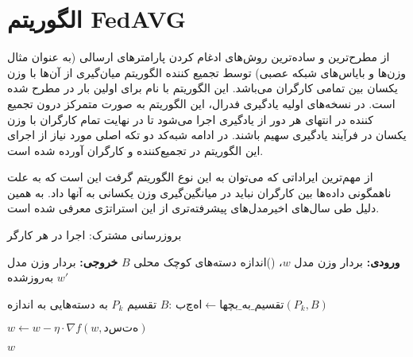 \chapter{الگوریتم FedAVG }

از مطرح‌ترین و ساده‌ترین روش‌های ادغام کردن پارامتر‌های ارسالی (به عنوان مثال وزن‌ها و بایاس‌های شبکه عصبی) توسط تجمیع کننده الگوریتم میان‌گیری از آن‌ها با وزن یکسان بین تمامی کارگران می‌باشد. این الگوریتم با نام  برای اولین بار در \cite{b6} مطرح شده است. در نسخه‌های اولیه یادگیری فدرال، این الگوریتم به صورت متمرکز درون تجمیع کننده در انتهای هر دور از یادگیری اجرا می‌شود تا در نهایت تمام کارگران با وزن یکسان در فرآیند یادگیری سهیم باشند. در ادامه شبه‌کد دو تکه اصلی مورد نیاز از اجرای این الگوریتم در تجمیع‌کننده و کارگران آورده شده است.


از مهم‌ترین ایراداتی که می‌توان به این نوع الگوریتم گرفت این است که به علت ناهمگونی داده‌ها بین کارگران نباید در میانگین‌گیری وزن یکسانی به آنها داد. به همین دلیل طی سال‌های اخیرمدل‌های پیشرفته‌تری از این استراتژی معرفی شده است\cite{ref4}.


\begin{algorithm}[tbp]
    \caption{بروزرسانی مشترک: اجرا در هر کارگر}
    \label{alg:client_update}
    \begin{algorithmic}[1]
        \State \textbf{ورودی:} بردار وزن مدل $w$، ()اندازه دسته‌های کوچک محلی $B$
        \State \textbf{خروجی:} بردار وزن مدل به‌روزشده $w'$
        
            \State تقسیم $P_k$ به دسته‌هایی به اندازه $B$: $بچها \gets \text{تقسیم\_به\_بچها}(P_k, B)$
            
             
                    \State $w \gets w - \eta \cdot \nabla f(w,دسته)$ 
                \EndFor
            \EndFor
            
            \State \Return $w$
        \EndFunction
    \end{algorithmic}
\end{algorithm}


